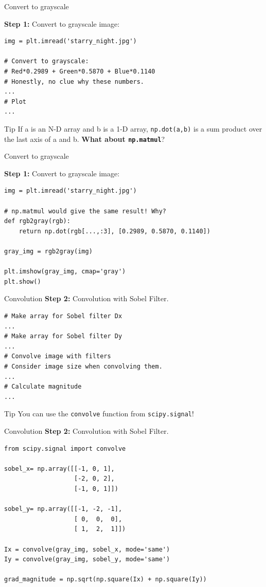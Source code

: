 \documentclass[compress%
,aspectratio=169%
]{beamer}
\newcommand{\code}{\lstinline}
\begin{document}
\begin{frame}[fragile]{Convert to grayscale}

\textbf{Step 1:} Convert to grayscale image:
\begin{lstlisting}
img = plt.imread('starry_night.jpg')

# Convert to grayscale:
# Red*0.2989 + Green*0.5870 + Blue*0.1140
# Honestly, no clue why these numbers.
...
# Plot
...
\end{lstlisting}
\begin{alertblock}{Tip}
If a is an N-D array and b is a 1-D array, \texttt{np.dot(a,b)} is a sum product over the last axis of a and b. \textbf{What about \texttt{np.matmul}}?\end{alertblock}
\end{frame}

\begin{frame}[fragile]{Convert to grayscale}

\textbf{Step 1:} Convert to grayscale image:
\begin{lstlisting}
img = plt.imread('starry_night.jpg')

# np.matmul would give the same result! Why?
def rgb2gray(rgb):
    return np.dot(rgb[...,:3], [0.2989, 0.5870, 0.1140])

gray_img = rgb2gray(img)

plt.imshow(gray_img, cmap='gray')
plt.show()
\end{lstlisting}
\end{frame}

\begin{frame}[fragile]{Convolution}
\textbf{Step 2:} Convolution with Sobel Filter.
\begin{lstlisting}
# Make array for Sobel filter Dx
...
# Make array for Sobel filter Dy
...
# Convolve image with filters
# Consider image size when convolving them.
...
# Calculate magnitude
...
\end{lstlisting}
\begin{alertblock}{Tip}
You can use the \code{convolve} function from \texttt{scipy.signal}!
\end{alertblock}
\end{frame}


\begin{frame}[fragile]{Convolution}
\textbf{Step 2:} Convolution with Sobel Filter.
\begin{lstlisting}
from scipy.signal import convolve

sobel_x= np.array([[-1, 0, 1], 
                   [-2, 0, 2],
                   [-1, 0, 1]])
                   
sobel_y= np.array([[-1, -2, -1], 
                   [ 0,  0,  0], 
                   [ 1,  2,  1]])

Ix = convolve(gray_img, sobel_x, mode='same')
Iy = convolve(gray_img, sobel_y, mode='same')

grad_magnitude = np.sqrt(np.square(Ix) + np.square(Iy))
\end{lstlisting}

\end{frame}
\end{document}
